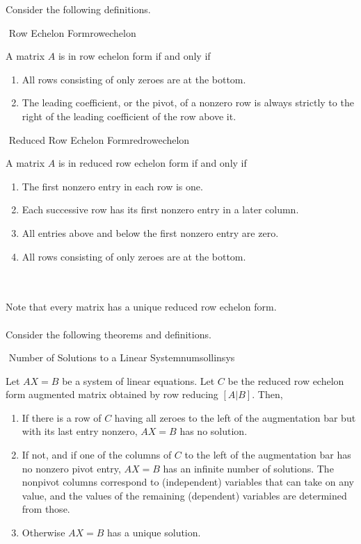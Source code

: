     Consider the following definitions.
    \begin{definition}{\Stop\,\,Row Echelon Form}{rowechelon}
        
        A matrix \(A\) is in row echelon form if and only if
        \begin{enumerate}
            \item All rows consisting of only zeroes are at the bottom.
            \item The leading coefficient, or the pivot, of a nonzero row is always strictly to the right of the leading coefficient of the row above it.
        \end{enumerate}
    
    \end{definition}
    \begin{definition}{\Stop\,\,Reduced Row Echelon Form}{redrowechelon}
    
        A matrix \(A\) is in reduced row echelon form if and only if
        \begin{enumerate}
            \item The first nonzero entry in each row is one.
            \item Each successive row has its first nonzero entry in a later column.
            \item All entries above and below the first nonzero entry are zero.
            \item All rows consisting of only zeroes are at the bottom.
        \end{enumerate}
        
    \end{definition}
    \vphantom
    \\
    \\
    Note that every matrix has a unique reduced row echelon form.
    \\
    \\
    Consider the following theorems and definitions.
    \begin{theorem}{\Stop\,\,Number of Solutions to a Linear System}{numsollinsys}
    
        Let \(AX=B\) be a system of linear equations. Let \(C\) be the reduced row echelon form augmented matrix obtained by row reducing \([A|B]\). Then,
        \begin{enumerate}
            \item If there is a row of \(C\) having all zeroes to the left of the augmentation bar but with its last entry nonzero, \(AX=B\) has no solution.
            \item If not, and if one of the columns of \(C\) to the left of the augmentation bar has no nonzero pivot entry, \(AX=B\) has an infinite number of solutions. The nonpivot columns correspond to (independent) variables that can take on any value, and the values of the remaining (dependent) variables are determined from those.
            \item Otherwise \(AX=B\) has a unique solution.
        \end{enumerate}
    
    \end{theorem}
